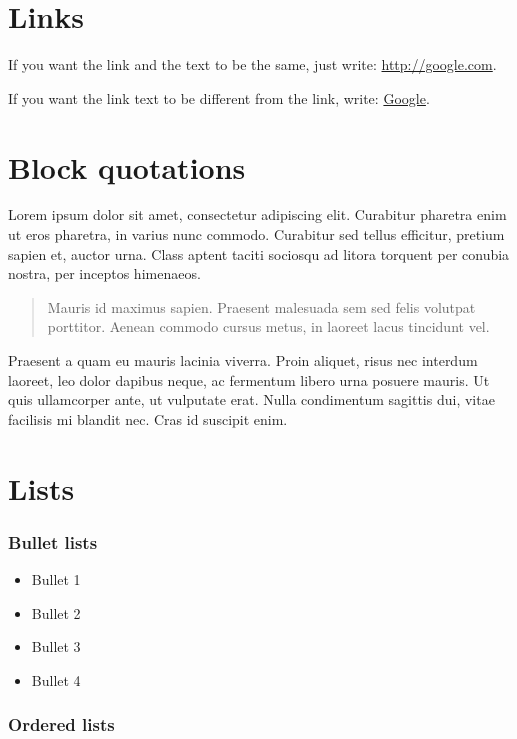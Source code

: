 \documentclass{article}
\begin{document}
\section{Links}

If you want the link and the text to be the same, just write:
\url{http://google.com}.

If you want the link text to be different from the link, write:
\href{http://google.com}{Google}.

\section{Block quotations}

Lorem ipsum dolor sit amet, consectetur adipiscing elit. Curabitur
pharetra enim ut eros pharetra, in varius nunc commodo. Curabitur sed
tellus efficitur, pretium sapien et, auctor urna. Class aptent taciti
sociosqu ad litora torquent per conubia nostra, per inceptos himenaeos.

\begin{quote}
Mauris id maximus sapien. Praesent malesuada sem sed felis volutpat
porttitor. Aenean commodo cursus metus, in laoreet lacus tincidunt vel.
\end{quote}

Praesent a quam eu mauris lacinia viverra. Proin aliquet, risus nec
interdum laoreet, leo dolor dapibus neque, ac fermentum libero urna
posuere mauris. Ut quis ullamcorper ante, ut vulputate erat. Nulla
condimentum sagittis dui, vitae facilisis mi blandit nec. Cras id
suscipit enim.

\section{Lists}

\subsubsection{Bullet lists}

\begin{itemize}
\item Bullet 1
\item Bullet 2
\item Bullet 3
\item Bullet 4
\end{itemize}

\subsubsection{Ordered lists}
\end{document}
